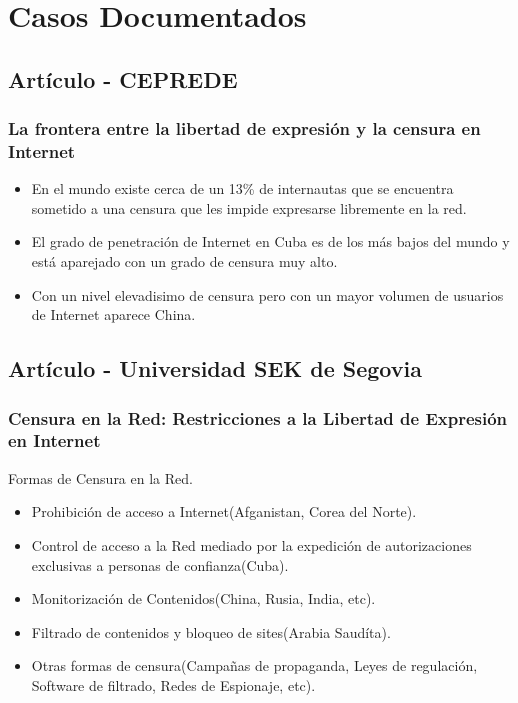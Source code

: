 \documentclass{beamer}
\begin{document}
\section{Casos Documentados}
\subsection{Art\'iculo - CEPREDE}
\frame
{
\transdissolve[duration=0.2]
\frametitle{La frontera entre la libertad de expresi\'on y la censura en Internet}
\begin{itemize}
\item En el mundo existe cerca de un 13\% de internautas que se encuentra sometido a una censura que les impide expresarse libremente en la red.
\item El grado de penetraci\'on de Internet en Cuba es de los m\'as bajos del mundo y est\'a aparejado con un grado de censura muy alto.
\item Con un nivel elevadisimo de censura pero con un mayor volumen de usuarios de Internet aparece China.
\end{itemize}
}

\subsection{Art\'iculo - Universidad SEK de Segovia}
\frame
{
\transdissolve[duration=0.2]
\frametitle{Censura en la Red: Restricciones a la Libertad de Expresi\'on en Internet}
Formas de Censura en la Red.
\begin{itemize}
\item Prohibici\'on de acceso a Internet(Afganistan, Corea del Norte).
\item Control de acceso a la Red mediado por la expedici\'on de autorizaciones exclusivas a personas de confianza(Cuba).
\item Monitorizaci\'on de Contenidos(China, Rusia, India, etc).
\item Filtrado de contenidos y bloqueo de sites(Arabia Saud\'ita).
\item Otras formas de censura(Campa\~nas de propaganda, Leyes de regulaci\'on, Software de filtrado, Redes de Espionaje, etc).
\end{itemize}
}
\end{document}
